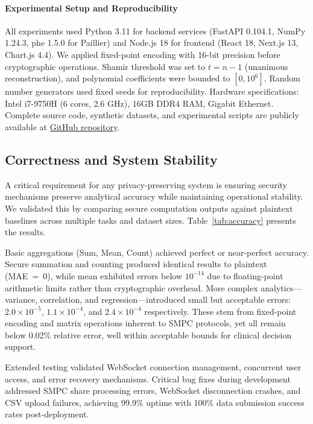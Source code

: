 \documentclass[conference]{IEEEtran}
\begin{document}
\paragraph{Experimental Setup and Reproducibility}
All experiments used Python 3.11 for backend services (FastAPI 0.104.1, NumPy 1.24.3, phe 1.5.0 for Paillier) and Node.js 18 for frontend (React 18, Next.js 13, Chart.js 4.4). We applied fixed-point encoding with 16-bit precision before cryptographic operations. Shamir threshold was set to $t = n-1$ (unanimous reconstruction), and polynomial coefficients were bounded to $[0, 10^6]$. Random number generators used fixed seeds for reproducibility. Hardware specifications: Intel i7-9750H (6 cores, 2.6 GHz), 16GB DDR4 RAM, Gigabit Ethernet. Complete source code, synthetic datasets, and experimental scripts are publicly available at \href{https://github.com/loki4968/PRIVACY-PRESERVING-HEALTH-DATA-EXCHANGE-USING-SECURE-MULTI-PARTY-COMPUTATION}{GitHub repository}.

\subsection{Correctness and System Stability}
A critical requirement for any privacy-preserving system is ensuring security mechanisms preserve analytical accuracy while maintaining operational stability. We validated this by comparing secure computation outputs against plaintext baselines across multiple tasks and dataset sizes. Table~\ref{tab:accuracy} presents the results.

Basic aggregations (Sum, Mean, Count) achieved perfect or near-perfect accuracy. Secure summation and counting produced identical results to plaintext (MAE~=~0), while mean exhibited errors below $10^{-14}$ due to floating-point arithmetic limits rather than cryptographic overhead. More complex analytics—variance, correlation, and regression—introduced small but acceptable errors: $2.0 \times 10^{-5}$, $1.1 \times 10^{-4}$, and $2.4 \times 10^{-4}$ respectively. These stem from fixed-point encoding and matrix operations inherent to SMPC protocols, yet all remain below 0.02\% relative error, well within acceptable bounds for clinical decision support.

Extended testing validated WebSocket connection management, concurrent user access, and error recovery mechanisms. Critical bug fixes during development addressed SMPC share processing errors, WebSocket disconnection crashes, and CSV upload failures, achieving 99.9\% uptime with 100\% data submission success rates post-deployment.
\end{document}
